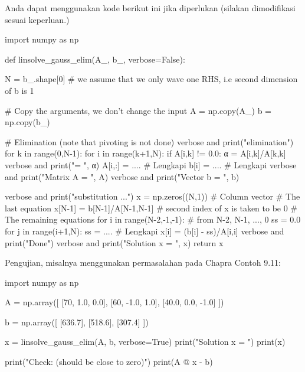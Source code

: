 Anda dapat menggunakan kode berikut ini jika diperlukan (silakan dimodifikasi sesuai
keperluan.)
\begin{pythoncode}
import numpy as np

def linsolve_gauss_elim(A_, b_, verbose=False):

    N = b_.shape[0]
    # we assume that we only wave one RHS, i.e second dimension of b is 1

    # Copy the arguments, we don't change the input
    A = np.copy(A_)
    b = np.copy(b_)
    
    # Elimination (note that pivoting is not done)
    verbose and print("\nForward elimination")
    for k in range(0,N-1):
        for i in range(k+1,N):
            if A[i,k] != 0.0:
                α = A[i,k]/A[k,k]
                verbose and print(" = ", α)
                A[i,:] = .... # Lengkapi
                b[i]   = .... # Lengkapi
            verbose and print("Matrix A = \n", A)
            verbose and print("Vector b = \n", b)
    
    verbose and print("\nBack substitution ...")
    x = np.zeros((N,1)) # Column vector
    # The last equation
    x[N-1] = b[N-1]/A[N-1,N-1] # second index of x is taken to be 0
    # The remaining equations
    for i in range(N-2,-1,-1): # from N-2, N-1, ..., 0
        ss = 0.0
        for j in range(i+1,N):
            ss = .... # Lengkapi
        x[i] = (b[i] - ss)/A[i,i]
    verbose and print("Done")
    verbose and print("Solution x = \n", x)
    return x    
\end{pythoncode}

Pengujian, misalnya menggunakan permasalahan pada Chapra Contoh 9.11:
\begin{pythoncode}
import numpy as np
    
A = np.array([
    [70, 1.0, 0.0],
    [60, -1.0, 1.0],
    [40.0, 0.0, -1.0]
])
    
b = np.array([
    [636.7],
    [518.6],
    [307.4]
])
    
x = linsolve_gauss_elim(A, b, verbose=True)
print("Solution x = ")
print(x)
    
print("Check: (should be close to zero)")
print(A @ x - b)
\end{pythoncode}

